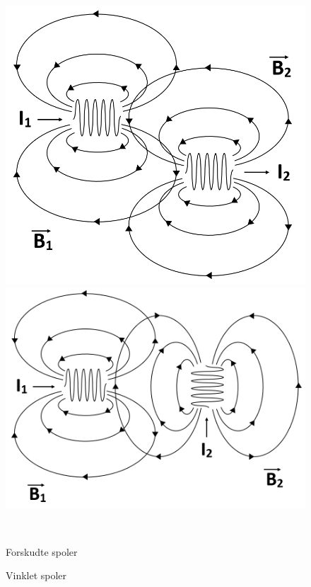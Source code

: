\begin{figure}[H]
	\centering
	\begin{minipage}[b]{0.48\textwidth}
	\centering
	\includegraphics[width=1\textwidth]{Vildledning/Schematics/forskudt_spole} %
	\end{minipage}
	\hfill
	\begin{minipage}[b]{0.48\textwidth}
	\centering
	\includegraphics[width=1\textwidth]{Vildledning/Schematics/vinklet_spole} %
	\end{minipage}
	\\ %
	\begin{minipage}[t]{0.48\textwidth}
	\caption{Forskudte spoler} %
	\label{fspoler}
	\end{minipage}
	\hfill
	\begin{minipage}[t]{0.48\textwidth}
	\caption{Vinklet spoler} %
	\label{vspoler}
	\end{minipage}
\end{figure}

